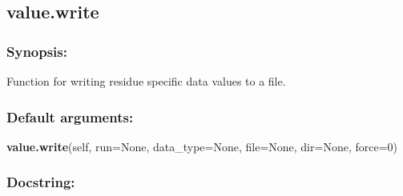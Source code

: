 


\newpage

\subsection{value.write}


\subsubsection{Synopsis:}

Function for writing residue specific data values to a file.

\subsubsection{Default arguments:}

\textsf{\textbf{value.write}(self, run=None, data\_type=None, file=None, dir=None, force=0)
}


\subsubsection{Docstring:}

